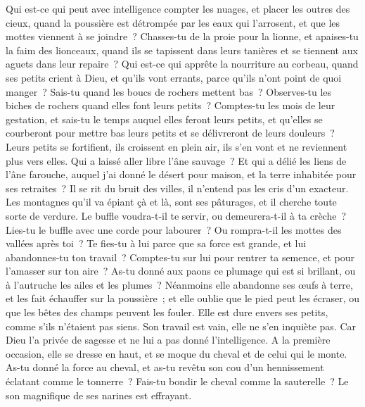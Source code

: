 \begin{multicols}{2}
Qui est-ce qui peut avec intelligence compter les nuages, et placer les outres des cieux,
quand la poussière est détrompée par les eaux qui l'arrosent, et que les mottes viennent à se joindre~?
\VerseOne{}Chasses-tu de la proie pour la lionne, et apaises-tu la faim des lionceaux,
quand ils se tapissent dans leurs tanières et se tiennent aux aguets dans leur repaire~?
Qui est-ce qui apprête la nourriture au corbeau, quand ses petits crient à Dieu, et qu'ils vont errants, parce qu'ils n'ont point de quoi manger~?
Sais-tu quand les boucs de rochers mettent bas~? Observes-tu les biches de rochers quand elles font leurs petits~?
Comptes-tu les mois de leur gestation, et sais-tu le temps auquel elles feront leurs petits,
et qu'elles se courberont pour mettre bas leurs petits et se délivreront de leurs douleurs~?
Leurs petits se fortifient, ils croissent en plein air, ils s'en vont et ne reviennent plus vers elles.
Qui a laissé aller libre l'âne sauvage~? Et qui a délié les liens de l'âne farouche,
auquel j'ai donné le désert pour maison, et la terre inhabitée pour ses retraites~?
Il se rit du bruit des villes, il n'entend pas les cris d'un exacteur.
Les montagnes qu'il va épiant çà et là, sont ses pâturages, et il cherche toute sorte de verdure. 
Le buffle voudra-t-il te servir, ou demeurera-t-il à ta crèche~? 
Lies-tu le buffle avec une corde pour labourer~? Ou rompra-t-il les mottes des vallées après toi~? 
Te fies-tu à lui parce que sa force est grande, et lui abandonnes-tu ton travail~? 
Comptes-tu sur lui pour rentrer ta semence, et pour l'amasser sur ton aire~? 
As-tu donné aux paons ce plumage qui est si brillant, ou à l'autruche les ailes et les plumes~? 
Néanmoins elle abandonne ses œufs à terre, et les fait échauffer sur la poussière~;
et elle oublie que le pied peut les écraser, ou que les bêtes des champs peuvent les fouler. 
Elle est dure envers ses petits, comme s'ils n'étaient pas siens. Son travail est vain, elle ne s'en inquiète pas.
Car Dieu l'a privée de sagesse et ne lui a pas donné l'intelligence.
A la première occasion, elle se dresse en haut, et se moque du cheval et de celui qui le monte. 
As-tu donné la force au cheval, et as-tu revêtu son cou d'un hennissement éclatant comme le tonnerre~? 
Fais-tu bondir le cheval comme la sauterelle~? Le son magnifique de ses narines est effrayant.

\end{multicols}
